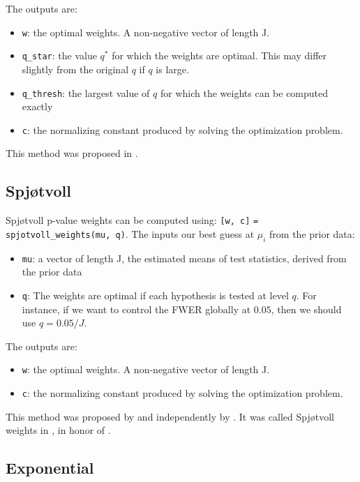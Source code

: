 \documentclass[english,11pt]{article} %
\begin{document}
The outputs are: 
\begin{itemize}
\item \verb+w+:  the optimal weights. A non-negative vector of length J.
\item \verb+q_star+: the value $q^*$ for which the weights are optimal. This may differ slightly from the original $q$ if $q$ is large.
\item \verb+q_thresh+: the largest value of $q$ for which the weights can be computed exactly 
\item \verb+c+:  the normalizing constant produced by solving the optimization problem.
\end{itemize}

This method was proposed in \cite{dobriban2015optimal}.

\subsection{Spj\o tvoll}


Spj\o tvoll p-value weights can be computed using:  \verb+[w, c]+ \verb+= spjotvoll_weights(mu, q)+. The inputs our best guess at $\mu_i$ from the prior data:

\begin{itemize}
\item \verb+mu+:  a vector of length J, the estimated means of test statistics, derived from the prior data
\item \verb+q+: The weights are optimal if each hypothesis is tested at level $q$. For instance, if we want to control the FWER globally at $0.05$, then we should use $q = 0.05/J$.
\end{itemize}

The outputs are: 
\begin{itemize}
\item \verb+w+:  the optimal weights. A non-negative vector of length J.
\item \verb+c+:  the normalizing constant produced by solving the optimization problem.
\end{itemize}

This method was proposed by \cite{wasserman2006weighted, roeder2009genome} and independently by \cite{rubin2006method}. It was called Spj\o tvoll weights in  \cite{dobriban2015optimal}, in honor of \citep{spjotvoll1972optimality}.

\subsection{Exponential}
\end{document}
